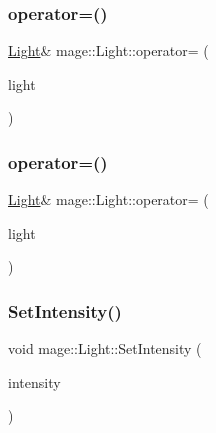 \subsubsection{\texorpdfstring{operator=()}{operator=()}\hspace{0.1cm}{\footnotesize\ttfamily [1/2]}}
{\footnotesize\ttfamily \hyperlink{classmage_1_1_light}{Light}\& mage\+::\+Light\+::operator= (\begin{DoxyParamCaption}\item[{const \hyperlink{classmage_1_1_light}{Light} \&}]{light }\end{DoxyParamCaption})\hspace{0.3cm}{\ttfamily [default]}}

\hypertarget{classmage_1_1_light_a59b74b31c7424f616f447eedf54155c7}{}\label{classmage_1_1_light_a59b74b31c7424f616f447eedf54155c7} 
\subsubsection{\texorpdfstring{operator=()}{operator=()}\hspace{0.1cm}{\footnotesize\ttfamily [2/2]}}
{\footnotesize\ttfamily \hyperlink{classmage_1_1_light}{Light}\& mage\+::\+Light\+::operator= (\begin{DoxyParamCaption}\item[{\hyperlink{classmage_1_1_light}{Light} \&\&}]{light }\end{DoxyParamCaption})\hspace{0.3cm}{\ttfamily [default]}}

\hypertarget{classmage_1_1_light_a24ea7425d31fcb28990f27daa1bd67ce}{}\label{classmage_1_1_light_a24ea7425d31fcb28990f27daa1bd67ce} 
\subsubsection{\texorpdfstring{Set\+Intensity()}{SetIntensity()}}
{\footnotesize\ttfamily void mage\+::\+Light\+::\+Set\+Intensity (\begin{DoxyParamCaption}\item[{const \hyperlink{structmage_1_1_r_g_b_spectrum}{R\+G\+B\+Spectrum} \&}]{intensity }\end{DoxyParamCaption})}



